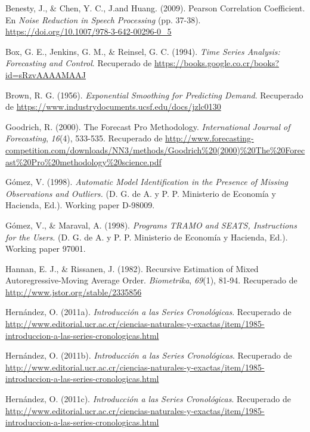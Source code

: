 \documentclass[]{article}
\begin{document}
\leavevmode\hypertarget{ref-pearson}{}%
Benesty, J., \& Chen, Y. C., J.and Huang. (2009). Pearson Correlation
Coefficient. En \emph{Noise Reduction in Speech Processing} (pp. 37-38).
\url{https://doi.org/10.1007/978-3-642-00296-0_5}

\leavevmode\hypertarget{ref-box-jenkins}{}%
Box, G. E., Jenkins, G. M., \& Reinsel, G. C. (1994). \emph{Time Series
Analysis: Forecasting and Control}. Recuperado de
\url{https://books.google.co.cr/books?id=sRzvAAAAMAAJ}

\leavevmode\hypertarget{ref-brown}{}%
Brown, R. G. (1956). \emph{Exponential Smoothing for Predicting Demand}.
Recuperado de \url{https://www.industrydocuments.ucsf.edu/docs/jzlc0130}

\leavevmode\hypertarget{ref-forecastpro}{}%
Goodrich, R. (2000). The Forecast Pro Methodology. \emph{International
Journal of Forecasting}, \emph{16}(4), 533-535. Recuperado de
\url{http://www.forecasting-competition.com/downloads/NN3/methods/Goodrich\%20(2000)\%20The\%20Forecast\%20Pro\%20methodology\%20science.pdf}

\leavevmode\hypertarget{ref-gomez}{}%
Gómez, V. (1998). \emph{Automatic Model Identification in the Presence
of Missing Observations and Outliers.} (D. G. de A. y P. P. Ministerio
de Economía y Hacienda, Ed.). Working paper D-98009.

\leavevmode\hypertarget{ref-tramo}{}%
Gómez, V., \& Maraval, A. (1998). \emph{Programs TRAMO and SEATS,
Instructions for the Users.} (D. G. de A. y P. P. Ministerio de Economía
y Hacienda, Ed.). Working paper 97001.

\leavevmode\hypertarget{ref-hannan}{}%
Hannan, E. J., \& Rissanen, J. (1982). Recursive Estimation of Mixed
Autoregressive-Moving Average Order. \emph{Biometrika}, \emph{69}(1),
81-94. Recuperado de \url{http://www.jstor.org/stable/2335856}

\leavevmode\hypertarget{ref-oscarh-1}{}%
Hernández, O. (2011a). \emph{Introducción a las Series Cronológicas}.
Recuperado de
\url{http://www.editorial.ucr.ac.cr/ciencias-naturales-y-exactas/item/1985-introduccion-a-las-series-cronologicas.html}

\leavevmode\hypertarget{ref-oscarh-2}{}%
Hernández, O. (2011b). \emph{Introducción a las Series Cronológicas}.
Recuperado de
\url{http://www.editorial.ucr.ac.cr/ciencias-naturales-y-exactas/item/1985-introduccion-a-las-series-cronologicas.html}

\leavevmode\hypertarget{ref-oscarh-3}{}%
Hernández, O. (2011c). \emph{Introducción a las Series Cronológicas}.
Recuperado de
\url{http://www.editorial.ucr.ac.cr/ciencias-naturales-y-exactas/item/1985-introduccion-a-las-series-cronologicas.html}
\end{document}
